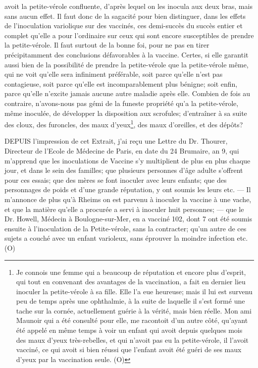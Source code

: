 avoit la petite-vérole confluente, d'après lequel on les inocula aux deux bras, mais sans aucun effet.
Il faut donc de la sagacité pour bien distinguer, dans les effets de l'inoculation variolique sur des vaccinés, ces demi-succès du succès entier et complet qu'elle a pour l'ordinaire sur ceux qui sont encore susceptibles de prendre la petite-vérole. Il faut surtout de la bonne foi, pour ne pas en tirer précipitamment des conclusions défavorables à la vaccine. Certes, si elle garantit aussi bien de la possibilité de prendre la petite-vérole que la petite-vérole même, qui ne voit qu'elle sera infiniment préférable, soit parce qu'elle n'est pas contagieuse, soit parce qu'elle est incomparablement plus bénigne; soit enfin, parce qu'elle n'excite jamais aucune autre maladie après elle. Combien de fois au contraire, n'avons-nous pas gémi de la funeste propriété qu'a la petite-vérole, même inoculée, de développer la disposition aux scrofules; d'entraîner à sa suite des cloux, des furoncles, des maux d'yeux\footnote{Je connois une femme qui a beaucoup de réputation et encore plus d'esprit, qui tout en convenant des avantages de la vaccination, a fait en dernier lieu inoculer la petite-vérole à sa fille. Elle l'a eue heureuse; mais il lui est survenu peu de temps après une ophthalmie, à la suite de laquelle il s'est formé une tache sur la cornée, actuellement guérie à la vérité, mais bien réelle. Mon ami Maunoir qui a été consulté pour elle, me racontoit d'un autre côté, qu'ayant été appelé en même temps à voir un enfant qui avoit depuis quelques mois des maux d'yeux très-rebelles, et qui n'avoit pas eu la petite-vérole, il l'avoit vacciné, ce qui avoit si bien réussi que l'enfant avoit été guéri de ses maux d'yeux par la vaccination seule. (O)}, des maux d'oreilles, et des dépôts?\setcounter{page}{290}

DEPUIS l'impression de cet Extrait, j'ai reçu une Lettre du Dr. Thourer, Directeur de l'Ecole de Médecine de Paris, en date du 24 Brumaire, an 9, qui m'apprend que les inoculations de Vaccine s'y multiplient de plus en plus chaque jour, et dans le sein des familles; que plusieurs personnes d'âge adulte s'offrent pour ces essais; que des mères se font inoculer avec leurs enfants; que des personnages de poids et d'une grande réputation, y ont soumis les leurs etc. — Il m'annonce de plus qu'à Rheims on est parvenu à inoculer la vaccine à une vache, et que la matière qu'elle a procurée a servi à inoculer huit personnes; — que le Dr. Howell, Médecin à Boulogne-sur-Mer, en a vacciné 102, dont 7 ont été soumis ensuite à l'inoculation de la Petite-vérole, sans la contracter; qu'un autre de ces sujets a couché avec un enfant varioleux, sans éprouver la moindre infection etc. (O)